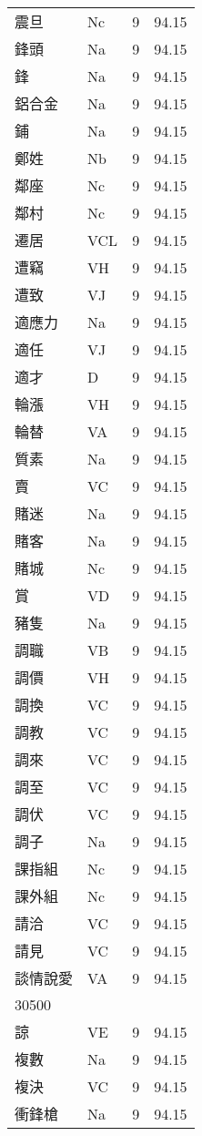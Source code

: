 \documentclass[twocolumn]{book}
\begin{document}
\begin{supertabular}{llrr}
震旦 & Nc & 9 &  94.15\\
鋒頭 & Na & 9 &  94.15\\
鋒 & Na & 9 &  94.15\\
鋁合金 & Na & 9 &  94.15\\
鋪 & Na & 9 &  94.15\\
鄭姓 & Nb & 9 &  94.15\\
鄰座 & Nc & 9 &  94.15\\
鄰村 & Nc & 9 &  94.15\\
遷居 & VCL & 9 &  94.15\\
遭竊 & VH & 9 &  94.15\\
遭致 & VJ & 9 &  94.15\\
適應力 & Na & 9 &  94.15\\
適任 & VJ & 9 &  94.15\\
適才 & D & 9 &  94.15\\
輪漲 & VH & 9 &  94.15\\
輪替 & VA & 9 &  94.15\\
質素 & Na & 9 &  94.15\\
賣 & VC & 9 &  94.15\\
賭迷 & Na & 9 &  94.15\\
賭客 & Na & 9 &  94.15\\
賭城 & Nc & 9 &  94.15\\
賞 & VD & 9 &  94.15\\
豬隻 & Na & 9 &  94.15\\
調職 & VB & 9 &  94.15\\
調價 & VH & 9 &  94.15\\
調換 & VC & 9 &  94.15\\
調教 & VC & 9 &  94.15\\
調來 & VC & 9 &  94.15\\
調至 & VC & 9 &  94.15\\
調伏 & VC & 9 &  94.15\\
調子 & Na & 9 &  94.15\\
課指組 & Nc & 9 &  94.15\\
課外組 & Nc & 9 &  94.15\\
請洽 & VC & 9 &  94.15\\
請見 & VC & 9 &  94.15\\
談情說愛 & VA & 9 &  94.15\\
30500\\
諒 & VE & 9 &  94.15\\
複數 & Na & 9 &  94.15\\
複決 & VC & 9 &  94.15\\
衝鋒槍 & Na & 9 &  94.15\\

\end{supertabular}
\end{document}
